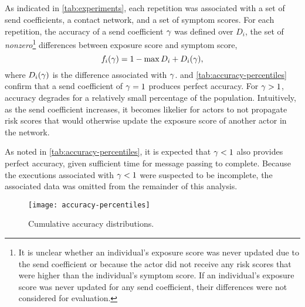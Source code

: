 \subsection{}\label{sec:parameters-experiment}

As indicated in \cref{tab:experiments}, each repetition was associated with a set of send coefficients, a contact network, and a set of symptom scores. For each repetition, the accuracy of a send coefficient $\gamma$ was defined over $D_i$, the set of \emph{nonzero}\footnote{It is unclear whether an individual's exposure score was never updated due to the send coefficient or because the actor did not receive any risk scores that were higher than the individual's symptom score. If an individual's exposure score was never updated for any send coefficient, their differences were not considered for evaluation.} differences between  exposure score and symptom score,
\begin{equation*}
  f_i(\gamma) = 1 - \max D_i + D_i(\gamma),
\end{equation*}
where $D_i(\gamma)$ is the difference associated with $\gamma$.  and \cref{tab:accuracy-percentiles} confirm that a send coefficient of $\gamma = 1$ produces perfect accuracy. For $\gamma > 1$, accuracy degrades for a relatively small percentage of the population. Intuitively, as the send coefficient increases, it becomes likelier for actors to not propagate risk scores that would otherwise update the exposure score of another actor in the network. 

As noted in \cref{tab:accuracy-percentiles}, it is expected that $\gamma < 1$ also provides perfect accuracy, given sufficient time for message passing to complete. Because the executions associated with $\gamma < 1$ were suspected to be incomplete, the associated data was omitted from the remainder of this analysis.

\begin{figure}[htbp]
  \centering
  \texttt{[image: accuracy-percentiles]}
  \caption[Cumulative accuracy distributions]{Cumulative accuracy distributions.}
  \label{fig:accuracy-percentiles}
\end{figure}

